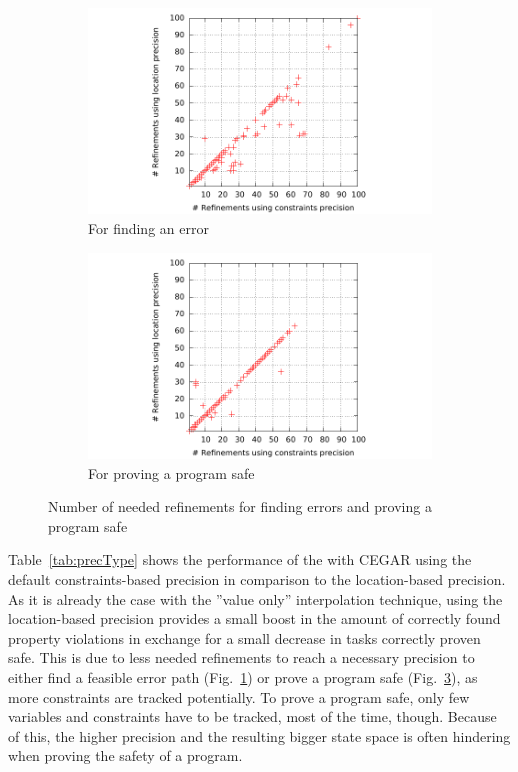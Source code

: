 \begin{figure}
\begin{subfigure}[b]{.48\textwidth}
\includegraphics[trim=2cm 0 1cm 0, clip=true, scale=.9]{evaluation/sp_constPrec_locPrec_refinementsErrorFinding}
\caption{For finding an error}
\label{fig:precType:refsFalse}
\end{subfigure}%
\hfill
\begin{subfigure}[b]{.48\textwidth}
\includegraphics[trim=2cm 0 1cm 0, clip=true, scale=.9]{evaluation/sp_constPrec_locPrec_refinementsSafeProving}
\caption{For proving a program safe}
\label{fig:precType:refsTrue}
\end{subfigure}
\caption{Number of needed refinements for finding errors and proving a program safe}
\end{figure}

Table~\ref{tab:precType} shows the performance of the \symbolicExecutionCPA with CEGAR using the default constraints-based precision in comparison to the location-based precision.
As it is already the case with the ''value only'' interpolation technique, using the location-based precision provides a small boost in the amount of correctly found property violations in exchange for a small decrease in tasks correctly proven safe.
This is due to less needed refinements to reach a necessary precision to either find a feasible error path (Fig.~\ref{fig:precType:refsFalse}) or prove a program safe (Fig.~\ref{fig:precType:refsTrue}), as more constraints are tracked potentially.
To prove a program safe, only few variables and constraints have to be tracked, most of the time, though.
Because of this, the higher precision and the resulting bigger state space is often hindering when proving the safety of a program.

